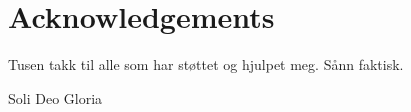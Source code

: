 \chapter*{Acknowledgements} %
Tusen takk til alle som har støttet og hjulpet meg. Sånn faktisk. \nl

{\huge \gothfamily Soli Deo Gloria}